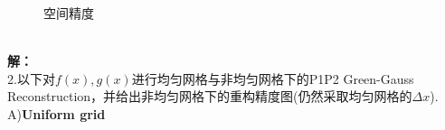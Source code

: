 \documentclass[a4paper,11pt,UTF8]{article}%
\theoremstyle{plain}
\begin{document}
\begin{figure}[!h]
	\centering
	\hfill
	\caption{空间精度}
\end{figure}\leavevmode\\
\clearpage
\textbf{解：}\\
\indent 2.以下对$f\left(x\right),g\left(x\right)$进行均匀网格与非均匀网格下的P1P2 Green-Gauss Reconstruction，并给出非均匀网格下的重构精度图(仍然采取均匀网格的$\Delta x$).\\
A)\textbf{Uniform grid}\\
\end{document}
